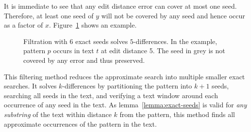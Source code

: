It is immediate to see that any edit distance error can cover at most one seed.
Therefore, at least one seed of $y$ will not be covered by any seed and hence occur as a factor of $x$.
Figure~\ref{fig:seeds-ext} shows an example.

\begin{figure}[h]
\begin{center}
\caption[Filtration with exact seeds]{Filtration with 6 exact seeds solves $5$-differences. In the example, pattern $p$ occurs in text $t$ at edit distance 5. The seed in grey is not covered by any error and thus preserved.}
\label{fig:seeds-ext}

\end{center}
\end{figure}

This filtering method reduces the approximate search into multiple smaller exact searches.
It solves $k$-differences by partitioning the pattern into $k+1$ seeds, searching all seeds in the text, and verifying a text window around each occurrence of any seed in the text.
As lemma~\ref{lemma:exact-seeds} is valid for \emph{any substring} of the text within distance $k$ from the pattern, this method finds all approximate occurrences of the pattern in the text.

